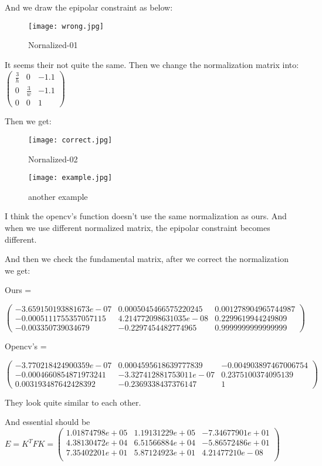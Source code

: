 \documentclass{article}
\begin{document}
And we draw the epipolar constraint as below:

\begin{figure}[h]
	\centering
	\texttt{[image: wrong.jpg]}
	\caption{Nornalized-01}
\end{figure}

It seems their not quite the same. Then we change the normalization matrix into:$\begin{pmatrix}
\frac{3}{h} & 0 & -1.1 \\
0 & \frac{3}{w} & -1.1 \\
0 & 0 & 1
\end{pmatrix}$

Then we get:
\begin{figure}[h]
	\centering
	\texttt{[image: correct.jpg]}
	\caption{Nornalized-02}
\end{figure}

\begin{figure}[h]
	\centering
	\texttt{[image: example.jpg]}
	\caption{another example}
\end{figure}

I think the opencv's function doesn't use the same normalization as ours. And when we use different normalized matrix, the epipolar constraint becomes different. 

And then we check the fundamental matrix, after we correct the normalization we get:

Ours = 

$\begin{pmatrix}
-3.659150193881673e-07 & 0.0005045466575220245& 0.001278904965744987\\
-0.0005111755357057115 & 4.214772098631035e-08& 0.2299619944249809\\
-0.003350739034679 & -0.2297454482774965 &0.9999999999999999
\end{pmatrix}$ 

Opencv's = 

$\begin{pmatrix}
-3.770218424900359e-07& 0.0004595618639777839& -0.004903897467006754\\
-0.0004660854871973241&-3.327412881753011e-07& 0.2375100374095139\\
0.003193487642428392& -0.2369338437376147& 1
\end{pmatrix}$ 

They look quite similar to each other.

And essential should be $E = K^{T}FK = \begin{pmatrix}
1.01874798e+05 & 1.19131229e+05 &-7.34677901e+01\\
4.38130472e+04 & 6.51566884e+04& -5.86572486e+01\\
7.35402201e+01 & 5.87124923e+01 & 4.21477210e-08\\
\end{pmatrix}$
\end{document}
